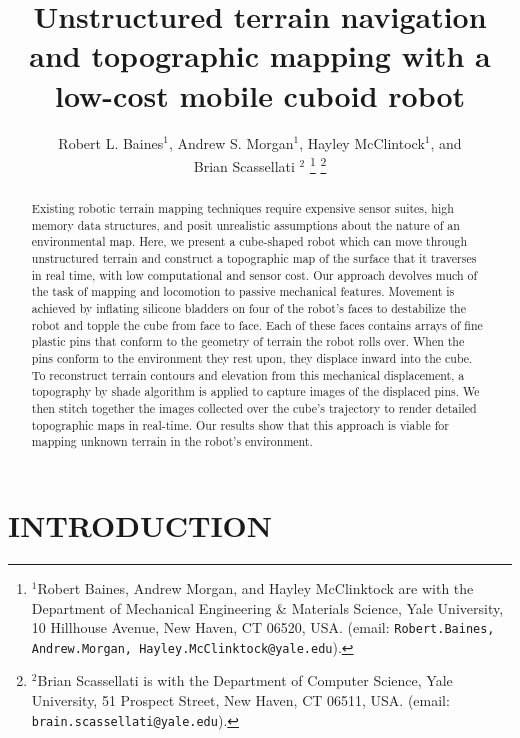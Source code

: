 \documentclass[letterpaper, 12 pt, conference]{ieeeconf}  %
\title{\LARGE \bf
Unstructured terrain navigation and  topographic mapping with a low-cost mobile cuboid robot
}
\begin{document}
\author
{Robert L. Baines$^{1}$, Andrew S. Morgan$^{1}$, Hayley McClintock$^{1}$,  and \\ Brian Scassellati $^{2}$ 
\thanks{$^{1}$Robert Baines, Andrew Morgan, and Hayley McClinktock are with the Department of Mechanical Engineering \& Materials Science, Yale University,  10 Hillhouse Avenue, New Haven, CT 06520, USA. (email: {\tt\small {Robert.Baines, Andrew.Morgan, Hayley.McClinktock}@yale.edu}).}
\thanks{$^{2}$Brian Scassellati is with the Department of Computer Science, Yale University,  51 Prospect Street, New Haven, CT 06511, USA. (email: {\tt\small {brain.scassellati}@yale.edu}).}
}


\maketitle
\thispagestyle{empty}
\pagestyle{empty}

\begin{abstract}

Existing robotic terrain mapping techniques require expensive sensor suites, high memory data structures, and posit unrealistic assumptions about the nature of an environmental map. Here, we present a cube-shaped robot which can move through unstructured terrain and construct a topographic map of the surface that it traverses in real time, with low computational and sensor cost. Our approach devolves much of the task of mapping and locomotion to passive mechanical features. Movement is achieved by inflating silicone bladders on four of the robot's faces to destabilize the robot and topple the cube from face to face. Each of these faces contains arrays of fine plastic pins that conform to the geometry of terrain the robot rolls over. When the pins conform to the environment they rest upon, they displace inward into the cube. To reconstruct terrain contours and elevation from this mechanical displacement, a topography by shade algorithm is applied to capture images of the displaced pins. We then stitch together the images collected over the cube's trajectory to render detailed topographic maps in real-time. Our results show that this approach is viable for mapping unknown terrain in the robot's environment. 
\end{abstract}

\section{INTRODUCTION}
\end{document}
